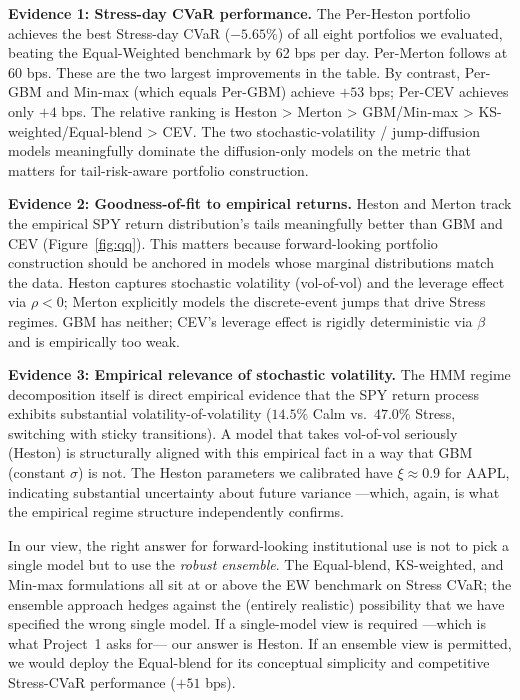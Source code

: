 \documentclass[11pt,letterpaper]{article}
\begin{document}
\textbf{Evidence 1: Stress-day CVaR performance.} The Per-Heston portfolio achieves the best Stress-day CVaR ($-5.65\%$) of all eight portfolios we evaluated, beating the Equal-Weighted benchmark by 62 bps per day. Per-Merton follows at 60 bps. These are the two largest improvements in the table. By contrast, Per-GBM and Min-max (which equals Per-GBM) achieve $+53$ bps; Per-CEV achieves only $+4$ bps. The relative ranking is Heston > Merton > GBM/Min-max > KS-weighted/Equal-blend > CEV. The two stochastic-volatility / jump-diffusion models meaningfully dominate the diffusion-only models on the metric that matters for tail-risk-aware portfolio construction.

\textbf{Evidence 2: Goodness-of-fit to empirical returns.} Heston and Merton track the empirical SPY return distribution's tails meaningfully better than GBM and CEV (Figure~\ref{fig:qq}). This matters because forward-looking portfolio construction should be anchored in models whose marginal distributions match the data. Heston captures stochastic volatility (vol-of-vol) and the leverage effect via $\rho < 0$; Merton explicitly models the discrete-event jumps that drive Stress regimes. GBM has neither; CEV's leverage effect is rigidly deterministic via $\beta$ and is empirically too weak.

\textbf{Evidence 3: Empirical relevance of stochastic volatility.} The HMM regime decomposition itself is direct empirical evidence that the SPY return process exhibits substantial volatility-of-volatility ($14.5\%$ Calm vs.\ $47.0\%$ Stress, switching with sticky transitions). A model that takes vol-of-vol seriously (Heston) is structurally aligned with this empirical fact in a way that GBM (constant $\sigma$) is not. The Heston parameters we calibrated have $\xi \approx 0.9$ for AAPL, indicating substantial uncertainty about future variance —which, again, is what the empirical regime structure independently confirms.

In our view, the right answer for forward-looking institutional use is not to pick a single model but to use the \emph{robust ensemble}. The Equal-blend, KS-weighted, and Min-max formulations all sit at or above the EW benchmark on Stress CVaR; the ensemble approach hedges against the (entirely realistic) possibility that we have specified the wrong single model. If a single-model view is required —which is what Project~1 asks for— our answer is Heston. If an ensemble view is permitted, we would deploy the Equal-blend for its conceptual simplicity and competitive Stress-CVaR performance ($+51$ bps).
\end{document}
